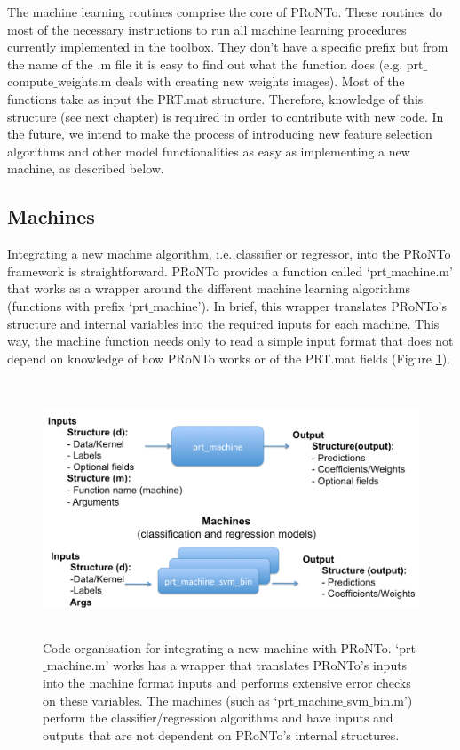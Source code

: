 The machine learning routines comprise the core of PRoNTo. These routines do most of the necessary instructions to run all machine learning procedures currently implemented in the toolbox. They don't have a specific prefix but from the name of the .m file it is easy to find out what the function does (e.g. prt$\_$compute$\_$weights.m deals with creating new weights images). Most of the functions take as input the PRT.mat structure. Therefore, knowledge of this structure (see next chapter) is required in order to contribute with new code. In the future, we intend to make the process of introducing new feature selection algorithms and other model functionalities as easy as implementing a new machine, as described below.

\subsection{Machines}

Integrating a new machine algorithm, i.e. classifier or regressor, into the PRoNTo framework is straightforward. PRoNTo provides a function called `prt$\_$machine.m' that works as a wrapper around the different machine learning algorithms (functions with prefix `prt$\_$machine'). In brief, this wrapper translates PRoNTo's structure and internal variables into the required inputs for each machine. This way, the machine function needs only to read a simple input format that does not depend on knowledge of how PRoNTo works or of the PRT.mat fields (Figure \ref{Fig1.2}).

\begin{figure}[!htbp]
  \begin{center}
      \includegraphics[height=3.0in]{images/machines.png}
   \caption{Code organisation for integrating a new machine with PRoNTo. `prt$\_$machine.m' works has a wrapper that translates PRoNTo's inputs into the machine format inputs and performs extensive error checks on these variables. The machines (such as `prt$\_$machine$\_$svm$\_$bin.m') perform the classifier/regression algorithms and have inputs and outputs that are not dependent on PRoNTo's internal structures.}
    \label{Fig1.2}
  \end{center}
\end{figure}

